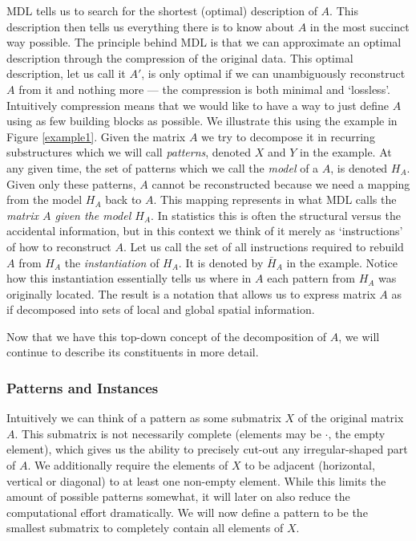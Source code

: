 \documentclass{llncs}
\begin{document}
MDL tells us to search for the shortest (optimal) description of $A$. This description then tells us everything there is to know about $A$ in the most succinct way possible. The principle behind MDL is that we can approximate an optimal description through the compression of the original data. This optimal description, let us call it $A'$, is only optimal if we can unambiguously reconstruct $A$ from it and nothing more --- the compression is both minimal and `lossless'. Intuitively compression means that we would like to have a way to just define $A$ using as few building blocks as possible. We illustrate this using the example in Figure \ref{example1}. Given the matrix $A$ we try to decompose it in recurring substructures which we will call \emph{patterns}, denoted $X$ and $Y$ in the example. At any given time, the set of patterns which we call the \emph{model} of a $A$, is denoted $H_A$. Given only these patterns, $A$ cannot be reconstructed because we need a mapping from the model $H_A$ back to $A$. This mapping represents in what MDL calls the \emph{matrix $A$ given the model $H_A$}. In statistics this is often the structural versus the accidental information, but in this context we think of it merely as `instructions' of how to reconstruct $A$. Let us call the set of all instructions required to rebuild $A$ from $H_A$ the \emph{instantiation} of $H_A$. It is denoted by $\bar{H}_A$ in the example. Notice how this instantiation essentially tells us where in $A$ each pattern from $H_A$ was originally located.  The result is a notation that allows us to express matrix $A$ as if decomposed into sets of local and global spatial information.

Now that we have this top-down concept of the decomposition of $A$, we will continue to describe its constituents in more detail.



\subsubsection{Patterns and Instances}
Intuitively we can think of a pattern as some submatrix $X$ of the original matrix $A$. This submatrix is not necessarily complete (elements may be $\cdot$, the empty element), which gives us the ability to precisely cut-out any irregular-shaped part of $A$. We additionally require the elements of $X$ to be adjacent (horizontal, vertical or diagonal) to at least one non-empty element. While this limits the amount of possible patterns somewhat, it will later on also reduce the computational effort dramatically. We will now define a pattern to be the smallest submatrix to completely contain all elements of $X$.
\end{document}
